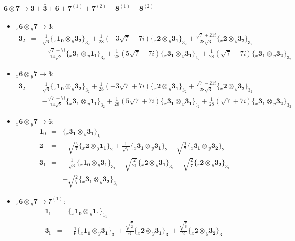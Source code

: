 \documentclass[english]{article}
\newcommand{\rep}[1]{\mathbf{#1}}
\newcommand{\repx}[2]{{}_{#2}\mathbf{#1}}
\newcommand{\subcg}[3]{\big\{ \repx{#1}{x}\otimes\repx{#2}{y}\big\}^{}_{#3}}
\begin{document}
\paragraph*{\Large $\rep{6}\otimes\rep{7}\to\rep{3}+\rep{\bar{3}}+\rep{6}+\rep{7}^{(1)}+\rep{7}^{(2)}+\rep{8}^{(1)}+\rep{8}^{(2)}$}
\begin{itemize}
\item $\repx{6}{x}\otimes\repx{7}{y}\to\rep{3}$:
\begin{eqnarray*}
\rep{3}_{2} &=& \frac{1}{\sqrt{6}}\subcg{1_{0}}{3_{2}}{3_{2}}+\frac{1}{28} \left(-3 \sqrt{7}-7 i\right)\subcg{2}{3_{1}}{3_{2}}+\frac{\sqrt{7}+21 i}{28 \sqrt{3}}\subcg{2}{3_{2}}{3_{2}} \\ 
 & & -\frac{\sqrt{7}+7 i}{14 \sqrt{2}}\subcg{3_{1}}{1_{1}}{3_{2}}+\frac{1}{28} \left(5 \sqrt{7}-7 i\right)\subcg{3_{1}}{3_{1}}{3_{2}}+\frac{1}{28} \left(\sqrt{7}-7 i\right)\subcg{3_{1}}{3_{2}}{3_{2}}
\end{eqnarray*}
\item $\repx{6}{x}\otimes\repx{7}{y}\to\rep{\bar{3}}$:
\begin{eqnarray*}
\rep{3}_{2} &=& \frac{1}{\sqrt{6}}\subcg{1_{0}}{3_{2}}{3_{2}}+\frac{1}{28} \left(-3 \sqrt{7}+7 i\right)\subcg{2}{3_{1}}{3_{2}}+\frac{\sqrt{7}-21 i}{28 \sqrt{3}}\subcg{2}{3_{2}}{3_{2}} \\ 
 & & -\frac{\sqrt{7}-7 i}{14 \sqrt{2}}\subcg{3_{1}}{1_{1}}{3_{2}}+\frac{1}{28} \left(5 \sqrt{7}+7 i\right)\subcg{3_{1}}{3_{1}}{3_{2}}+\frac{1}{28} \left(\sqrt{7}+7 i\right)\subcg{3_{1}}{3_{2}}{3_{2}}
\end{eqnarray*}
\item $\repx{6}{x}\otimes\repx{7}{y}\to\rep{6}$:
\begin{eqnarray*}
\rep{1}_{0} &=& \subcg{3_{1}}{3_{1}}{1_{0}}
\\
\rep{2} &=& -\sqrt{\frac{3}{7}}\subcg{2}{1_{1}}{2}+\frac{1}{\sqrt{7}}\subcg{3_{1}}{3_{1}}{2}-\sqrt{\frac{3}{7}}\subcg{3_{1}}{3_{2}}{2}
\\
\rep{3}_{1} &=& -\frac{1}{\sqrt{3}}\subcg{1_{0}}{3_{1}}{3_{1}}-\sqrt{\frac{2}{21}}\subcg{2}{3_{1}}{3_{1}}-\sqrt{\frac{2}{7}}\subcg{2}{3_{2}}{3_{1}} \\ 
 & & -\sqrt{\frac{2}{7}}\subcg{3_{1}}{3_{2}}{3_{1}}
\end{eqnarray*}
\item $\repx{6}{x}\otimes\repx{7}{y}\to\rep{7}^{(1)}$:
\begin{eqnarray*}
\rep{1}_{1} &=& \subcg{1_{0}}{1_{1}}{1_{1}}
\\
\rep{3}_{1} &=& -\frac{1}{6}\subcg{1_{0}}{3_{1}}{3_{1}}+\frac{\sqrt{\frac{7}{2}}}{6}\subcg{2}{3_{1}}{3_{1}}+\frac{\sqrt{\frac{7}{6}}}{2}\subcg{2}{3_{2}}{3_{1}} \\ 

\end{eqnarray*}
\end{itemize}
\end{document}
